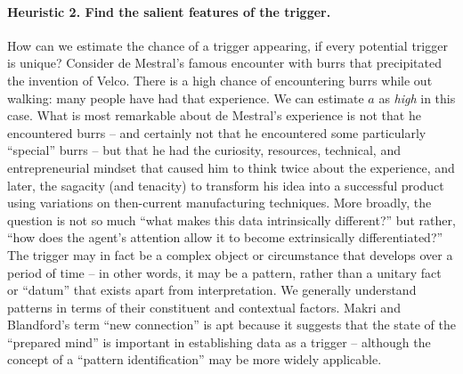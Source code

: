 \paragraph{Heuristic 2. Find the salient features of the trigger.}
\label{heur:2}
How can we estimate the chance of a trigger appearing, if every potential
trigger is unique?  Consider de Mestral's famous encounter with burrs that precipitated the invention of Velco\texttrademark.  There
is a high chance of encountering burrs while
out walking: many
people have had that experience.  We can
estimate $a$ as
\emph{high} in this case.  What is most remarkable about de Mestral's experience is
not that he encountered burrs -- and certainly not that he encountered
some particularly ``special'' burrs -- but that he had the
curiosity, resources, technical, and entrepreneurial mindset that caused him to think
twice about the experience, and later, the sagacity (and tenacity) to
transform his idea into a successful product using variations on
then-current manufacturing techniques.
More broadly, the question is not so much ``what makes this data
intrinsically different?'' but rather, ``how does the agent's
attention allow it to become extrinsically differentiated?''  The
trigger may in fact be a complex object or circumstance that develops
over a period of time -- in other words, it may be a pattern, rather
than a unitary fact or ``datum'' that exists apart from
interpretation.  We generally  understand patterns in terms of
their constituent and contextual factors.
Makri and Blandford's \cite{Makri2012a} term ``new connection''
is apt because it suggests that the state of the ``prepared mind'' is
important in establishing data as a trigger -- although the concept of a ``pattern identification'' may be more widely applicable.


